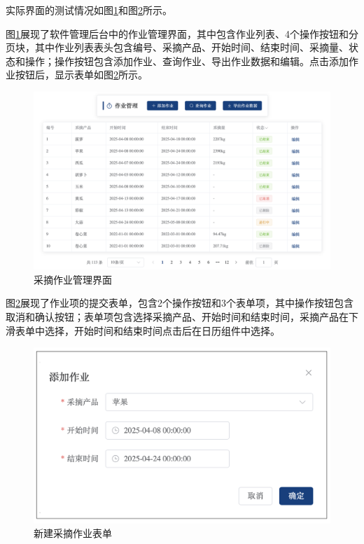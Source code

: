 实际界面的测试情况如图\ref{fig:web-work}和图\ref{fig:form-new-work}所示。

图\ref{fig:web-work}展现了软件管理后台中的作业管理界面，其中包含作业列表、4个操作按钮和分页块，其中作业列表表头包含编号、采摘产品、开始时间、结束时间、采摘量、状态和操作；操作按钮包含添加作业、查询作业、导出作业数据和编辑。点击添加作业按钮后，显示表单如图\ref{fig:form-new-work}所示。

\begin{figure}
    \centering
    \includegraphics[width=0.9\linewidth]{../result/web-work.png}
    \caption{采摘作业管理界面}
    \label{fig:web-work}
\end{figure}

图\ref{fig:form-new-work}展现了作业项的提交表单，包含2个操作按钮和3个表单项，其中操作按钮包含取消和确认按钮；表单项包含选择采摘产品、开始时间和结束时间，采摘产品在下滑表单中选择，开始时间和结束时间点击后在日历组件中选择。

\begin{figure}
    \centering
    \includegraphics[width=0.9\linewidth]{../result/form-new-work.png}
    \caption{新建采摘作业表单}
    \label{fig:form-new-work}
\end{figure}

